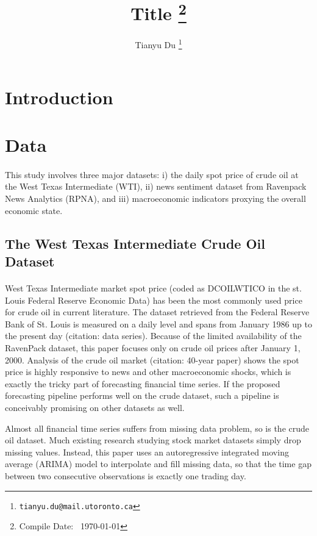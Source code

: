 \documentclass[12pt]{article}
\title{Title \footnote{Compile Date: \currenttime\ \today}}
\author{Tianyu Du \footnote{\texttt{tianyu.du@mail.utoronto.ca}}}
\begin{document}
	\maketitle
	\tableofcontents
	\newpage
	\section{Introduction}
	
	\section{Data}
	\paragraph{}This study involves three major datasets: i) the daily spot price of crude oil at the West Texas Intermediate (WTI), ii) news sentiment dataset from Ravenpack News Analytics (RPNA), and iii) macroeconomic indicators proxying the overall economic state.

	\subsection{The West Texas Intermediate Crude Oil Dataset}
	\paragraph{}West Texas Intermediate market spot price (coded as DCOILWTICO in the st. Louis Federal Reserve Economic Data) has been the most commonly used price for crude oil in current literature. The dataset retrieved from the Federal Reserve Bank of St. Louis is measured on a daily level and spans from January 1986 up to the present day (citation: data series). Because of the limited availability of the RavenPack dataset, this paper focuses only on crude oil prices after January 1, 2000. Analysis of the crude oil market (citation: 40-year paper) shows the spot price is highly responsive to news and other macroeconomic shocks, which is exactly the tricky part of forecasting financial time series. If the proposed forecasting pipeline performs well on the crude dataset, such a pipeline is conceivably promising on other datasets as well.

	\par Almost all financial time series suffers from missing data problem, so is the crude oil dataset. Much existing research studying stock market datasets simply drop missing values. Instead, this paper uses an autoregressive integrated moving average (ARIMA) model to interpolate and fill missing data, so that the time gap between two consecutive observations is exactly one trading day. 
\end{document}
